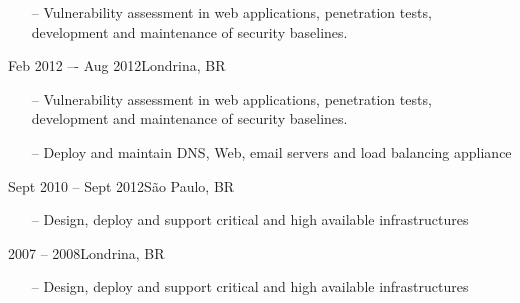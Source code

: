 \documentclass[10pt,a4paper]{altacv}
\begin{document}


\begin{itemize}
    \setlength{\itemindent}{0.5em}
    \item[--]   \small{ Vulnerability assessment in web applications, 
	    penetration tests, development and maintenance of security baselines.}
\end{itemize}



{Feb 2012 –- Aug 2012}{Londrina, BR}

\begin{itemize}
    \setlength{\itemindent}{0.5em}
    \item[--]   \small{ Vulnerability assessment in web applications, 
	    penetration tests, development and maintenance of security baselines.}
\end{itemize}




\begin{itemize}
    \setlength{\itemindent}{0.5em}
    \item[--]   \small{Deploy and maintain DNS, Web, email servers and load 
	    balancing appliance}
\end{itemize}



{Sept 2010 -- Sept 2012}{São Paulo, BR}

\begin{itemize}
    \setlength{\itemindent}{0.5em}
    \item[--]   \small{Design, deploy and support critical and high available 
	    infrastructures}
\end{itemize}




{2007 -- 2008}{Londrina, BR}

\begin{itemize}
    \setlength{\itemindent}{0.5em}
    \item[--]   \small{Design, deploy and support critical and high available 
	    infrastructures}
\end{itemize}
\medskip
\end{document}
